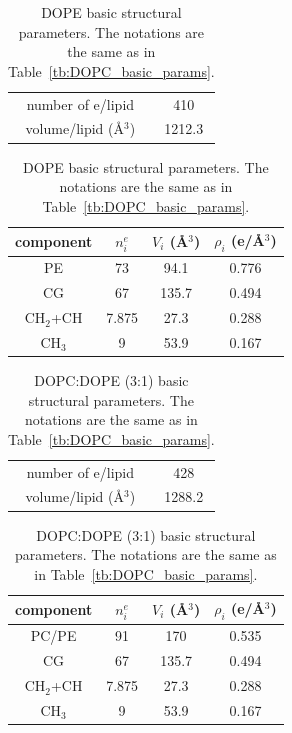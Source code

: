 \documentclass[12pt,letterpaper]{article}
\begin{document}
\begin{table}[htbp]
  \centering
  \begin{tabular}{ cc }
  \hline
    number of e/lipid & 410 \\ 
    volume/lipid (\AA$^3$) & 1212.3 \\
  \hline
  \end{tabular}
  \quad
  \begin{tabular}{ cccc }
    \hline
    component & $n^e_i$ & $V_i$ (\AA$^3$) & $\rho_i$ (e/\AA$^3$) \\
    \hline 
    PE & 73 & 94.1 & 0.776 \\  
    CG & 67 & 135.7 & 0.494 \\  
    CH$_2$+CH & 7.875 & 27.3 & 0.288 \\
    CH$_3$ & 9 & 53.9 & 0.167 \\
    \hline
  \end{tabular}
  \caption{DOPE basic structural parameters. The notations are the same
  as in Table~\ref{tb:DOPC_basic_params}.}
  \label{tb:DOPE_basic_params}
\end{table}
\begin{table}[htbp]
  \centering
  \begin{tabular}{ cc }
  \hline
    number of e/lipid & 428 \\ 
    volume/lipid (\AA$^3$) & 1288.2 \\
  \hline
  \end{tabular}
  \quad
  \begin{tabular}{ cccc }
    \hline
    component & $n^e_i$ & $V_i$ (\AA$^3$) & $\rho_i$ (e/\AA$^3$) \\
    \hline 
    PC/PE & 91 & 170 & 0.535 \\  
    CG & 67 & 135.7 & 0.494 \\  
    CH$_2$+CH & 7.875 & 27.3 & 0.288 \\
    CH$_3$ & 9 & 53.9 & 0.167 \\
    \hline
  \end{tabular}
  \caption{DOPC:DOPE (3:1) basic structural parameters. The notations are the same
  as in Table~\ref{tb:DOPC_basic_params}.}
  \label{tb:PCPE3:1_basic_params}
\end{table}
\end{document}
